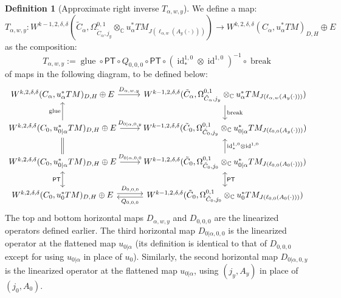 \documentclass[12pt]{article}
\theoremstyle{definition}
\newtheorem{definition}[theorem]{Definition}
\theoremstyle{remark}
\numberwithin{equation}{subsection}
\newcommand{\CC}{\mathbb C}
\newcommand{\PT}{\mathsf{PT}}
\newcommand{\id}{\operatorname{id}}
\begin{document}
\begin{definition}[Approximate right inverse $T_{\alpha,w,y}$]
We define a map:
\begin{equation}
T_{\alpha,w,y}:W^{k-1,2,\delta,\delta}(\tilde C_\alpha,\Omega^{0,1}_{\tilde C_\alpha,j_y}\otimes_\CC u_\alpha^\ast TM_{J(\ell_{\alpha,w}(A_y(\cdot)))})\to W^{k,2,\delta,\delta}(C_\alpha,u_\alpha^\ast TM)_{D,H}\oplus E
\end{equation}
as the composition:
\begin{equation}
T_{\alpha,w,y}:={\operatorname{glue}}\circ\PT\circ Q_{0,0,0}\circ\PT\circ(\id^{1,0}_\ast\otimes\id^{1,0})^{-1}\circ\operatorname{break}
\end{equation}
of maps in the following diagram, to be defined below:
\begin{equation}\label{biginversediagramHF}
\begin{tikzcd}
W^{k,2,\delta,\delta}(C_\alpha,u_\alpha^\ast TM)_{D,H}\oplus E\ar{r}{D_{\alpha,w,y}}&W^{k-1,2,\delta,\delta}(\tilde C_\alpha,\Omega^{0,1}_{\tilde C_\alpha,j_y}\otimes_\CC u_\alpha^\ast TM_{J(\ell_{\alpha,w}(A_y(\cdot)))})\ar{d}{\mathrm{break}}\\
W^{k,2,\delta,\delta}(C_0,u_{0|\alpha}^\ast TM)_{D,H}\oplus E\ar{u}{\mathrm{glue}}\ar{r}{D_{0|\alpha,0,y}}&W^{k-1,2,\delta,\delta}(\tilde C_0,\Omega^{0,1}_{\tilde C_0,j_y}\otimes_\CC u_{0|\alpha}^\ast TM_{J(\ell_{0,0}(A_y(\cdot)))})\\
W^{k,2,\delta,\delta}(C_0,u_{0|\alpha}^\ast TM)_{D,H}\oplus E\ar[equals]{u}\ar{r}{D_{0|\alpha,0,0}}&W^{k-1,2,\delta,\delta}(\tilde C_0,\Omega^{0,1}_{\tilde C_0,j_0}\otimes_\CC u_{0|\alpha}^\ast TM_{J(\ell_{0,0}(A_0(\cdot)))})\ar[leftrightarrow]{d}{\PT}\ar[swap]{u}{{\id^{1,0}_\ast}\otimes{\id^{1,0}}}\\
W^{k,2,\delta,\delta}(C_0,u_0^\ast TM)_{D,H}\oplus E\ar[leftrightarrow]{u}{\PT}\ar[yshift=0.5ex]{r}{D_{0,0,0}}&\ar[yshift=-0.5ex]{l}{Q_{0,0,0}}W^{k-1,2,\delta,\delta}(\tilde C_0,\Omega^{0,1}_{\tilde C_0,j_0}\otimes_\CC u_0^\ast TM_{J(\ell_{0,0}(A_0(\cdot)))})
\end{tikzcd}
\end{equation}
The top and bottom horizontal maps $D_{\alpha,w,y}$ and $D_{0,0,0}$ are the linearized operators defined earlier.  The third horizontal map $D_{0|\alpha,0,0}$ is the linearized operator at the flattened map $u_{0|\alpha}$ (its definition is identical to that of $D_{0,0,0}$ except for using $u_{0|\alpha}$ in place of $u_0$).  Similarly, the second horizontal map $D_{0|\alpha,0,y}$ is the linearized operator at the flattened map $u_{0|\alpha}$, using $(j_y,A_y)$ in place of $(j_0,A_0)$.


\end{definition}
\end{document}
